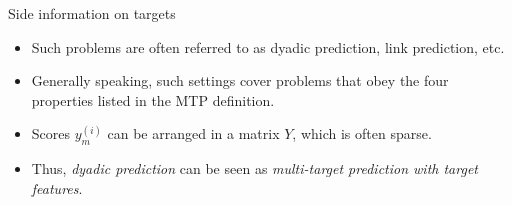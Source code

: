 \documentclass[11pt,compress,t,notes=noshow, xcolor=table]{beamer}
\newcommand{\yim}{y^{(i)}_m}
\begin{document}
\begin{vbframe}{Side information on targets}
\begin{itemize}
        \footnotesize
        
        \item Such problems are often referred to as dyadic prediction, link prediction, etc.
        
        \item Generally speaking, such settings cover problems that obey the four properties listed in the MTP definition.
        
        \item Scores $\yim$ can be arranged in a matrix $Y$, which is often sparse. 
        
        \item Thus, \emph{dyadic prediction} can be seen as \emph{multi-target prediction with target features}. 
    \end{itemize}
\end{vbframe}
\end{document}
